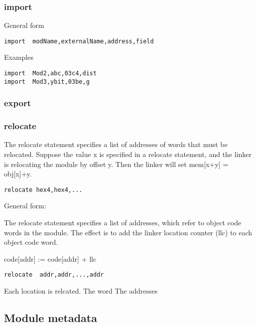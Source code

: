 \documentclass[11pt]{article}
\begin{document}
\subsubsection*{import}
\label{sec:orgdf7e349}

General form

\begin{verbatim}
import  modName,externalName,address,field
\end{verbatim}

Examples

\begin{verbatim}
import  Mod2,abc,03c4,dist
import  Mod3,ybit,03be,g
\end{verbatim}

\subsubsection*{export}
\label{sec:org524f509}


\subsubsection*{relocate}
\label{sec:org2ff4c41}

The relocate statement specifies a list of addresses of words that
must be relocated.  Suppose the value x is specified in a relocate
statement, and the linker is relocating the module by offset y.  Then
the linker will set mem[x+y] = obj[x]+y.

\begin{verbatim}
relocate hex4,hex4,...
\end{verbatim}



General form:

The relocate statement specifies a list of addresses, which refer to
object code words in the module.  The effect is to add the linker
location counter (llc) to each object code word.

code[addr] := code[addr] + llc

\begin{verbatim}
relocate  addr,addr,...,addr
\end{verbatim}

Each location is relcated.  The word The addresses 

\subsection*{Module metadata}
\label{sec:org0429b18}
\end{document}
